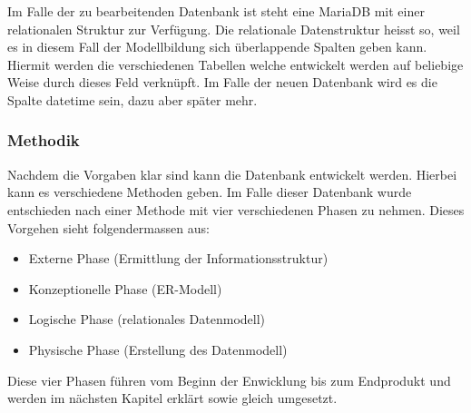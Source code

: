 Im Falle der zu bearbeitenden Datenbank ist steht eine MariaDB mit einer relationalen Struktur zur Verfügung. Die relationale Datenstruktur heisst so, weil es in diesem Fall der Modellbildung sich überlappende Spalten geben kann.\cite{IntroductionToRelationalDatabases:MariaDB} Hiermit werden die verschiedenen Tabellen welche entwickelt werden auf beliebige Weise durch dieses Feld verknüpft. Im Falle der neuen Datenbank wird es die Spalte datetime sein, dazu aber später mehr.\\

\subsubsection{Methodik}
Nachdem die Vorgaben klar sind kann die Datenbank entwickelt werden. Hierbei kann es verschiedene Methoden geben. Im Falle dieser Datenbank wurde entschieden nach einer Methode mit vier verschiedenen Phasen zu nehmen. \cite{Datenbanken:GrundlagenUndEntwurf:VeikkoKrypczyk} Dieses Vorgehen sieht folgendermassen aus:
\begin{itemize}
\item Externe Phase (Ermittlung der Informationsstruktur)
\item Konzeptionelle Phase (ER-Modell)
\item Logische Phase (relationales Datenmodell)
\item Physische Phase (Erstellung des Datenmodell)
\end{itemize}

Diese vier Phasen führen vom Beginn der Enwicklung bis zum Endprodukt und werden im nächsten Kapitel erklärt sowie gleich umgesetzt.
